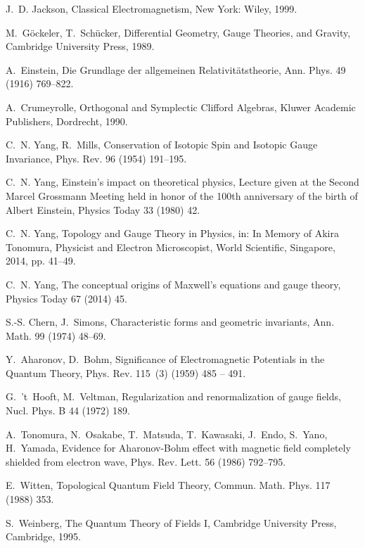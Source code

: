 \documentclass[1p,sort&compress]{elsarticle}
\numberwithin{equation}{section}
\begin{document}
\begin{thebibliography}{999}
J.~D. Jackson, {Classical Electromagnetism}, New York: Wiley, 1999.

M.~G\"ockeler, T.~Sch\"ucker, {Differential Geometry, Gauge Theories, and
  Gravity}, Cambridge University Press, 1989.

A.~Einstein, {Die Grundlage der allgemeinen Relativit\"atstheorie}, Ann. Phys.
  49 (1916) 769--822.

A.~Crumeyrolle, {Orthogonal and Symplectic Clifford Algebras}, Kluwer Academic
  Publishers, Dordrecht, 1990.

C.~N. Yang, R.~Mills, {Conservation of Isotopic Spin and Isotopic Gauge
  Invariance}, Phys. Rev. 96 (1954) 191--195.

C.~N. Yang, {Einstein's impact on theoretical physics, Lecture given at the
  Second Marcel Grossmann Meeting held in honor of the 100th anniversary of the
  birth of Albert Einstein}, Physics Today 33 (1980) 42.

C.~N. Yang, {Topology and Gauge Theory in Physics}, in: {In Memory of Akira
  Tonomura, Physicist and Electron Microscopist}, World Scientific, Singapore,
  2014, pp. 41--49.

C.~N. Yang, {The conceptual origins of Maxwell's equations and gauge theory}, 
  Physics Today 67 (2014) 45.

S.-S. Chern, J.~Simons, {Characteristic forms and geometric invariants}, Ann.
  Math. 99 (1974) 48--69.

Y.~Aharonov, D.~Bohm, {Significance of Electromagnetic Potentials in the
  Quantum Theory}, Phys. Rev. 115~(3) (1959) 485 -- 491.

G.~'t~Hooft, M.~Veltman, {Regularization and renormalization of gauge fields},
  Nucl. Phys. B 44 (1972) 189.

A.~Tonomura, N.~Osakabe, T.~Matsuda, T.~Kawasaki, J.~Endo, S.~Yano, H.~Yamada,
  {Evidence for Aharonov-Bohm effect with magnetic field completely shielded
  from electron wave}, Phys. Rev. Lett. 56 (1986) 792--795.

E.~Witten, {Topological Quantum Field Theory}, Commun. Math. Phys. 117 (1988)
  353.

S.~Weinberg, {The Quantum Theory of Fields I}, Cambridge University Press,
  Cambridge, 1995.


\end{thebibliography}
\end{document}
